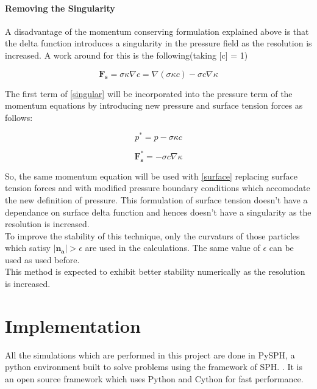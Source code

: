 \subsubsection{Removing the Singularity}

A disadvantage of the momentum conserving formulation explained above is that the delta function introduces a singularity in the pressure field as the resolution is increased. A work around for this is the following(taking [c] = 1)

\begin{equation}
 \mathbf{F_s} = \sigma \kappa \nabla c = \nabla(\sigma \kappa c) - \sigma c \nabla \kappa
\label{singular}
 \end{equation}
\noindent

The first term of \ref{singular} will be incorporated into the pressure term of the momentum equations by introducing new pressure and surface tension forces as follows:

\begin{equation}
 p^* = p - \sigma \kappa c
\end{equation}

\begin{equation}
 \mathbf{F_s^*} = - \sigma c \nabla \kappa 
 \label{surface}
\end{equation}

\noindent
So, the same momentum equation will be used with \ref{surface} replacing surface tension forces and with modified pressure boundary conditions which accomodate the new definition of pressure. This formulation of surface tension doesn't have a dependance on surface delta function and hences doesn't have a singularity as the resolution is increased.\\

To improve the stability of this technique, only the curvaturs of those particles which satisy $\left | \mathbf{n_a}\right| > \epsilon$ are used in the calculations. The same value of $\epsilon$ can be used as used before. \\

This method is expected to exhibit better stability numerically as the resolution is increased. 


\chapter{Implementation}

All the simulations which are performed in this project are done in PySPH, a python environment built to solve problems using the framework of SPH. \cite{prabhu}. It is an open source framework which uses Python and Cython for fast performance. \\

